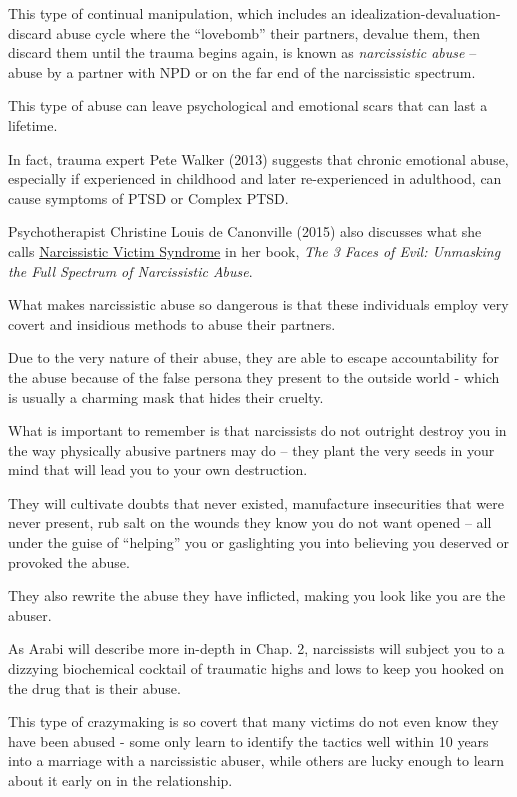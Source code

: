 \documentclass[oneside]{book}
\numberwithin{equation}{section}
\begin{document}
This type of continual manipulation, which includes an idealization-devaluation-discard abuse cycle where the ``lovebomb'' their partners, devalue them, then discard them until the trauma begins again, is known as \textit{narcissistic abuse} -- abuse by a partner with NPD or on the far end of the narcissistic spectrum.

This type of abuse can leave psychological and emotional scars that can last a lifetime.

%
In fact, trauma expert Pete Walker (2013) suggests that chronic emotional abuse, especially if experienced in childhood and later re-experienced in adulthood, can cause symptoms of PTSD or Complex PTSD.

Psychotherapist Christine Louis de Canonville (2015) also discusses what she calls \href{https://narcissisticbehavior.net/narcissistic-victim-syndrome-what-the-heck-is-that/}{Narcissistic Victim Syndrome} in her book, \textit{The 3 Faces of Evil: Unmasking the Full Spectrum of Narcissistic Abuse}.

What makes narcissistic abuse so dangerous is that these individuals employ very covert and insidious methods to abuse their partners.

Due to the very nature of their abuse, they are able to escape accountability for the abuse because of the false persona they present to the outside world - which is usually a charming mask that hides their cruelty.

%
What is important to remember is that narcissists do not outright destroy you in the way physically abusive partners may do -- they plant the very seeds in your mind that will lead you to your own destruction.

They will cultivate doubts that never existed, manufacture insecurities that were never present, rub salt on the wounds they know you do not want opened -- all under the guise of ``helping'' you or gaslighting you into believing you deserved or provoked the abuse.

They also rewrite the abuse they have inflicted, making you look like you are the abuser.

%
As Arabi will describe more in-depth in Chap. 2, narcissists will subject you to a dizzying biochemical cocktail of traumatic highs and lows to keep you hooked on the drug that is their abuse.

This type of crazymaking is so covert that many victims do not even know they have been abused - some only learn to identify the tactics well within 10 years into a marriage with a narcissistic abuser, while others are lucky enough to learn about it early on in the relationship.
\end{document}
